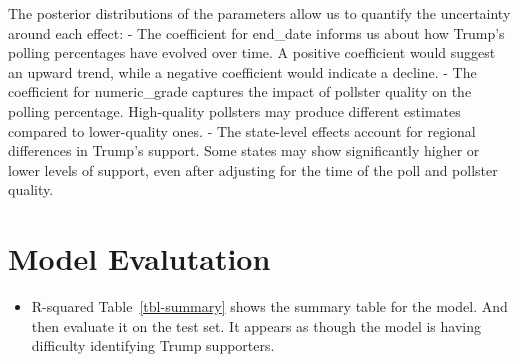\documentclass[
  letterpaper,
  DIV=11,
  numbers=noendperiod]{scrartcl}
\providecommand{\tightlist}{%
  \setlength{\itemsep}{0pt}\setlength{\parskip}{0pt}}\usepackage{longtable,booktabs,array}
\begin{document}
The posterior distributions of the parameters allow us to quantify the
uncertainty around each effect: - The coefficient for end\_date informs
us about how Trump's polling percentages have evolved over time. A
positive coefficient would suggest an upward trend, while a negative
coefficient would indicate a decline. - The coefficient for
numeric\_grade captures the impact of pollster quality on the polling
percentage. High-quality pollsters may produce different estimates
compared to lower-quality ones. - The state-level effects account for
regional differences in Trump's support. Some states may show
significantly higher or lower levels of support, even after adjusting
for the time of the poll and pollster quality.

\section{Model Evalutation}\label{model-evalutation}

\begin{itemize}
\tightlist
\item
  R-squared Table~\ref{tbl-summary} shows the summary table for the
  model. And then evaluate it on the test set. It appears as though the
  model is having difficulty identifying Trump supporters.
\end{itemize}
\end{document}
